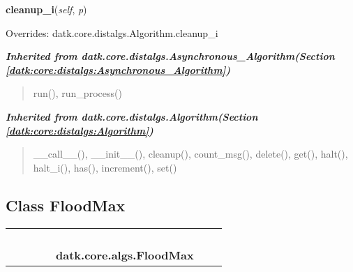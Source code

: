     \vspace{0.5ex}

\hspace{.8\funcindent}\begin{boxedminipage}{\funcwidth}

    \raggedright \textbf{cleanup\_i}(\textit{self}, \textit{p})

\setlength{\parskip}{2ex}
\setlength{\parskip}{1ex}
      Overrides: datk.core.distalgs.Algorithm.cleanup\_i

    \end{boxedminipage}


\large{\textbf{\textit{Inherited from datk.core.distalgs.Asynchronous\_Algorithm\textit{(Section \ref{datk:core:distalgs:Asynchronous_Algorithm})}}}}

\begin{quote}
run(), run\_process()
\end{quote}

\large{\textbf{\textit{Inherited from datk.core.distalgs.Algorithm\textit{(Section \ref{datk:core:distalgs:Algorithm})}}}}

\begin{quote}
\_\_call\_\_(), \_\_init\_\_(), cleanup(), count\_msg(), delete(), get(), halt(), halt\_i(), has(), increment(), set()
\end{quote}


\subsection{Class FloodMax}

    \label{datk:core:algs:FloodMax}
\begin{tabular}{cccccccc}
\multicolumn{2}{r}{\settowidth{\BCL}{datk.core.distalgs.Algorithm}\multirow{2}{\BCL}{datk.core.distalgs.Algorithm}}
&&
&&
  \\\cline{3-3}
  &&\multicolumn{1}{c|}{}
&&
&&
  \\
\multicolumn{4}{r}{\settowidth{\BCL}{datk.core.distalgs.Synchronous\_Algorithm}\multirow{2}{\BCL}{datk.core.distalgs.Synchronous\_Algorithm}}
&&
  \\\cline{5-5}
  &&&&\multicolumn{1}{c|}{}
&&
  \\
&&&&\multicolumn{2}{l}{\textbf{datk.core.algs.FloodMax}}
\end{tabular}

